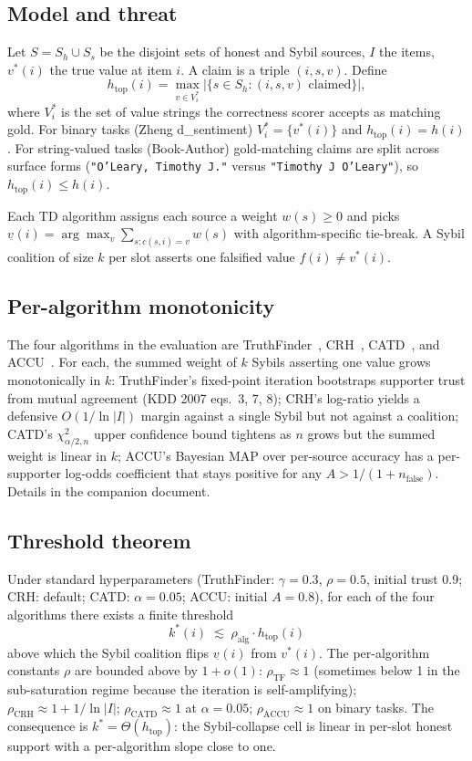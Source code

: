 \documentclass[sigconf, nonacm]{acmart}
\begin{document}
\subsection{Model and threat}
Let $S = S_h \cup S_s$ be the disjoint sets of honest and Sybil sources, $I$ the items, $v^{*}(i)$ the true value at item $i$. A claim is a triple $(i, s, v)$. Define
\[
h_{\text{top}}(i) = \max_{v \in V^{*}_{i}} \left| \{ s \in S_h : (i, s, v) \text{ claimed} \} \right|,
\]
where $V^{*}_{i}$ is the set of value strings the correctness scorer accepts as matching gold. For binary tasks (Zheng d\_sentiment) $V^{*}_{i} = \{v^{*}(i)\}$ and $h_{\text{top}}(i) = h(i)$. For string-valued tasks (Book-Author) gold-matching claims are split across surface forms (\texttt{"O'Leary, Timothy J."} versus \texttt{"Timothy J O'Leary"}), so $h_{\text{top}}(i) \leq h(i)$.

Each TD algorithm assigns each source a weight $w(s) \geq 0$ and picks
$
v_{\hat{}}(i) = \arg\max_v \sum_{s : c(s,i)=v} w(s)
$
with algorithm-specific tie-break. A Sybil coalition of size $k$ per slot asserts one falsified value $f(i) \neq v^{*}(i)$.

\subsection{Per-algorithm monotonicity}
The four algorithms in the evaluation are TruthFinder~\cite{yin2007truthfinder}, CRH~\cite{li2014crh}, CATD~\cite{li2015catd}, and ACCU~\cite{dong2009accu}. For each, the summed weight of $k$ Sybils asserting one value grows monotonically in $k$: TruthFinder's fixed-point iteration bootstraps supporter trust from mutual agreement (KDD 2007 eqs.\ 3, 7, 8); CRH's log-ratio yields a defensive $O(1/\ln|I|)$ margin against a single Sybil but not against a coalition; CATD's $\chi^{2}_{\alpha/2, n}$ upper confidence bound tightens as $n$ grows but the summed weight is linear in $k$; ACCU's Bayesian MAP over per-source accuracy has a per-supporter log-odds coefficient that stays positive for any $A > 1/(1+n_{\text{false}})$. Details in the companion document.

\subsection{Threshold theorem}
Under standard hyperparameters (TruthFinder: $\gamma=0.3$, $\rho=0.5$, initial trust 0.9; CRH: default; CATD: $\alpha=0.05$; ACCU: initial $A=0.8$), for each of the four algorithms there exists a finite threshold
\[
k^{*}(i) \;\lesssim\; \rho_{\text{alg}} \cdot h_{\text{top}}(i)
\]
above which the Sybil coalition flips $v_{\hat{}}(i)$ from $v^{*}(i)$. The per-algorithm constants $\rho$ are bounded above by $1 + o(1)$: $\rho_{\text{TF}} \approx 1$ (sometimes below 1 in the sub-saturation regime because the iteration is self-amplifying); $\rho_{\text{CRH}} \approx 1 + 1/\ln|I|$; $\rho_{\text{CATD}} \approx 1$ at $\alpha=0.05$; $\rho_{\text{ACCU}} \approx 1$ on binary tasks. The consequence is $k^{*} = \Theta(h_{\text{top}})$: the Sybil-collapse cell is linear in per-slot honest support with a per-algorithm slope close to one.
\end{document}
